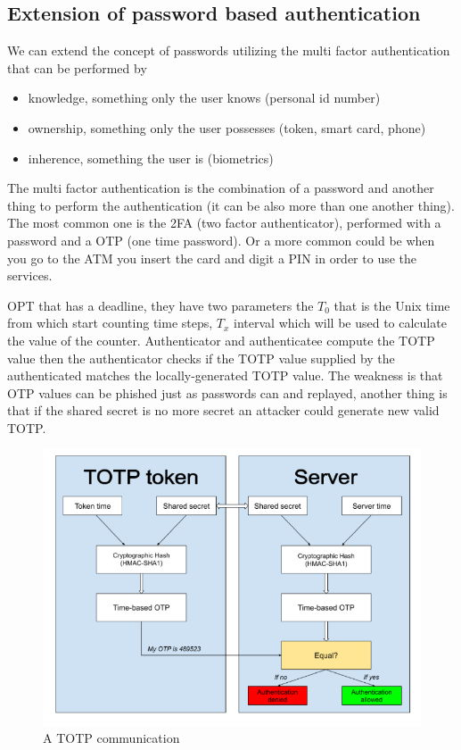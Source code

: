     \subsection{Extension of password based authentication}
    We can extend the concept of passwords utilizing the multi factor authentication that can be performed by
    \begin{itemize}
        \item knowledge, something only the user knows (personal id number)
        \item ownership, something only the user possesses (token, smart card, phone)
        \item inherence, something the user is (biometrics)
    \end{itemize}
    The multi factor authentication is the combination of a password and another thing to perform the authentication (it can be also more than one another thing). The most common one is the 2FA (two factor authenticator), performed with a password and a OTP (one time password). Or a more common could be when you go to the ATM you insert the card and digit a PIN in order to use the services.
    
    OPT that has a deadline, they have two parameters the $T_0$ that is the Unix time from which start counting time steps, $T_x$ interval which will be used to calculate the value of the counter. Authenticator and authenticatee compute the TOTP value then the authenticator checks if the TOTP value supplied by the authenticated matches the locally-generated TOTP value. The weakness is that OTP values can be phished just as passwords can and replayed, another thing is that if the shared secret is no more secret an attacker could generate new valid TOTP.
    \begin{figure}[h!]
        \centering
        \includegraphics[scale=0.35]{images/TOTP.png}
        \caption{A TOTP communication}
        \label{fig:TOTP}
    \end{figure}
    
